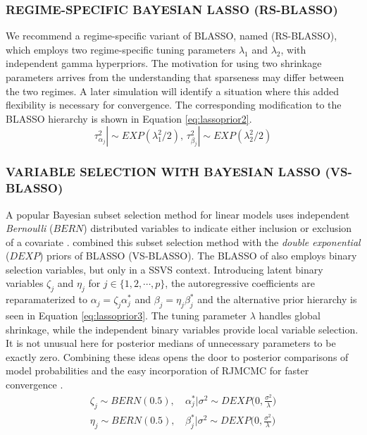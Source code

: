 \subsubsection{REGIME-SPECIFIC BAYESIAN LASSO (RS-BLASSO)}
We recommend a regime-specific variant of BLASSO, named (RS-BLASSO), which employs two regime-specific tuning parameters $\lambda_1$ and $\lambda_2$, with independent gamma hyperpriors. The motivation for using two shrinkage parameters arrives from the understanding that sparseness may differ between the two regimes. A later simulation will identify a situation where this added flexibility is necessary for convergence. The corresponding modification to the BLASSO hierarchy is shown in Equation \ref{eq:lassoprior2}. 
\begin{equation}
	\label{eq:lassoprior2}
	 \tau^2_{\alpha_j}| \sim EXP(\lambda_1^2/2) \textrm{,  } \tau^2_{\beta_j}| \sim EXP(\lambda_2^2/2)
\end{equation}

 \subsubsection{VARIABLE SELECTION WITH BAYESIAN LASSO (VS-BLASSO)}
A popular Bayesian subset selection method for linear models uses independent \textit{Bernoulli} ($BERN$) distributed variables to indicate either inclusion or exclusion of a covariate \citep{Kuo1998}. \cite{Lykou2013} combined this subset selection method with the \textit{double exponential} ($DEXP$) priors of BLASSO (VS-BLASSO). The BLASSO of \cite{Yuan2005} also employs binary selection variables, but only in a SSVS context. Introducing latent binary variables $\zeta_j$ and $\eta_j$ for $j \in \{1,2,\cdots, p\}$, the autoregressive coefficients are reparamaterized to $\alpha_j=\zeta_j\alpha_j^*$ and $\beta_j=\eta_j\beta_j^*$ and the alternative prior hierarchy is seen in  Equation \ref{eq:lassoprior3}. The tuning parameter $\lambda$ handles global shrinkage, while the independent binary variables provide local variable selection. It is not unusual here for posterior medians of unnecessary parameters to be exactly zero. Combining these ideas opens the door to posterior comparisons of model probabilities and the easy incorporation of RJMCMC for faster convergence \citep{Dellaportas2002}.
\begin{equation}
\begin{split}
	\label{eq:lassoprior3}
	 \zeta_j \sim BERN(0.5) \textrm{,  } & \alpha_j^*|\sigma^2\sim DEXP\Big(0,\frac{\sigma^2}{\lambda}\Big) \\
	  \eta_j \sim BERN(0.5) \textrm{,  } & \beta_j^*|\sigma^2\sim DEXP\Big(0,\frac{\sigma^2}{\lambda}\Big)
\end{split}
\end{equation}

